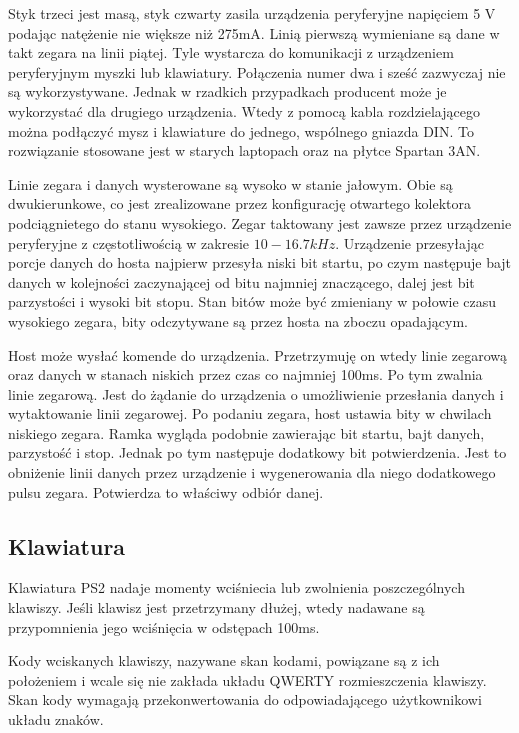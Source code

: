 \documentclass[a4paper,12pt]{article}
\begin{document}
Styk trzeci jest masą, styk czwarty zasila urządzenia peryferyjne napięciem 5 V podając natężenie nie większe niż 275mA. Linią pierwszą wymieniane są dane w takt zegara na linii piątej. Tyle wystarcza do komunikacji z urządzeniem peryferyjnym myszki lub klawiatury. Połączenia numer dwa i sześć zazwyczaj nie są wykorzystywane. Jednak w rzadkich przypadkach producent może je wykorzystać dla drugiego urządzenia. Wtedy z pomocą kabla rozdzielającego można podłączyć mysz i klawiature do jednego, wspólnego gniazda DIN. To rozwiązanie stosowane jest w starych laptopach oraz na płytce Spartan 3AN.

Linie zegara i danych wysterowane są wysoko w stanie jałowym. Obie są dwukierunkowe, co jest zrealizowane przez konfigurację otwartego kolektora podciągnietego do stanu wysokiego. Zegar taktowany jest zawsze przez urządzenie peryferyjne z częstotliwością w zakresie $10 - 16.7 kHz$. Urządzenie przesyłając porcje danych do hosta najpierw przesyła niski bit startu, po czym następuje bajt danych w kolejności zaczynającej od bitu najmniej znaczącego, dalej jest bit parzystości i wysoki bit stopu. Stan bitów może być zmieniany w połowie czasu wysokiego zegara, bity odczytywane są przez hosta na zboczu opadającym.

Host może wysłać komende do urządzenia. Przetrzymuję on wtedy linie zegarową oraz danych w stanach niskich przez czas co najmniej 100ms. Po tym zwalnia linie zegarową. Jest do żądanie do urządzenia o umożliwienie przesłania danych i wytaktowanie linii zegarowej. Po podaniu zegara, host ustawia bity w chwilach niskiego zegara. Ramka wygląda podobnie zawierając bit startu, bajt danych, parzystość i stop. Jednak po tym następuje dodatkowy bit potwierdzenia. Jest to obniżenie linii danych przez urządzenie i wygenerowania dla niego dodatkowego pulsu zegara. Potwierdza to właściwy odbiór danej.

\subsection{Klawiatura}

Klawiatura PS2 nadaje momenty wciśniecia lub zwolnienia poszczególnych klawiszy. Jeśli klawisz jest przetrzymany dłużej, wtedy nadawane są przypomnienia jego wciśnięcia w odstępach 100ms.

Kody wciskanych klawiszy, nazywane skan kodami, powiązane są z ich położeniem i wcale się nie zakłada układu QWERTY rozmieszczenia klawiszy. Skan kody wymagają przekonwertowania do odpowiadającego użytkownikowi układu znaków.
\end{document}
